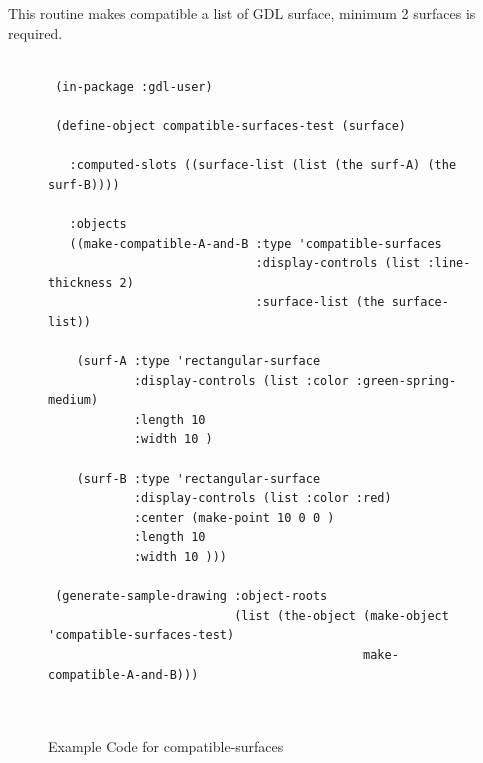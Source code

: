 \documentclass [11pt]{book}
\begin{document}
\begin{itemize}
\begin{description}
This routine makes compatible a list of GDL surface, minimum 2 surfaces is required.



\end{description}




\begin{figure}
\begin{lrbox}{\boxedverb}
\begin{minipage}{\linewidth}
{\small

\begin{verbatim}

 (in-package :gdl-user)

 (define-object compatible-surfaces-test (surface) 

   :computed-slots ((surface-list (list (the surf-A) (the surf-B))))
  
   :objects
   ((make-compatible-A-and-B :type 'compatible-surfaces
                             :display-controls (list :line-thickness 2)
                             :surface-list (the surface-list))

    (surf-A :type 'rectangular-surface
            :display-controls (list :color :green-spring-medium)
            :length 10
            :width 10 )
                                        
    (surf-B :type 'rectangular-surface
            :display-controls (list :color :red)
            :center (make-point 10 0 0 )
            :length 10
            :width 10 )))

 (generate-sample-drawing :object-roots 
                          (list (the-object (make-object 'compatible-surfaces-test) 
                                            make-compatible-A-and-B)))
 
 
\end{verbatim}}
\end{minipage}
\end{lrbox}
\fbox{\usebox{\boxedverb}}

\caption{Example Code for compatible-surfaces}

\label{fig:example-code-compatible-surfaces}

\end{figure}


\end{itemize}
\end{document}
